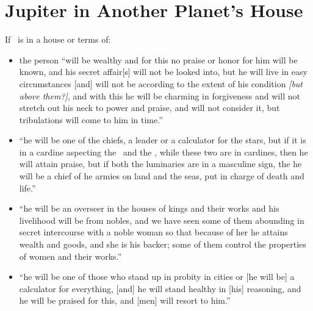 \section{Jupiter in Another Planet's House}
If \Jupiter\, is in a house or terms of:
\begin{itemize}[topsep=0em,itemsep=0em]
\item[\Saturn] the person ``will be wealthy and for this no praise or honor for him will be known, and his secret affair[s] will not be looked into, but he will live in easy circumstances [and] will not be according to the extent of his condition  \textsl{[but above them?]}, and with this he will be charming in forgiveness and will not stretch out his neck to power and praise, and will not consider it, but tribulations will come to him in time.''

\item[\Mars] ``he will be one of the chiefs, a leader or a calculator for the stars, but if it is in a cardine aspecting the \Moon\, and the \Sun, while these two are in cardines, then he will attain praise, but if both the luminaries are in a masculine sign, the he will be a chief of he armies on land and the seas, put in charge of death and life.''

\item[\Venus] ``he will be an overseer in the houses of kings and their works and his livelihood will be from nobles, and we have seen some of them abounding in secret intercourse with a noble woman so that because of her he attains wealth and goods, and she is his backer; some of them control the properties of women and their works.''

\item[\Mercury] ``he will be one of those who stand up in probity in cities or [he will be] a calculator for everything, [and] he will stand healthy in [his] reasoning, and he will be praised for this, and [men] will resort to him.''
\end{itemize}